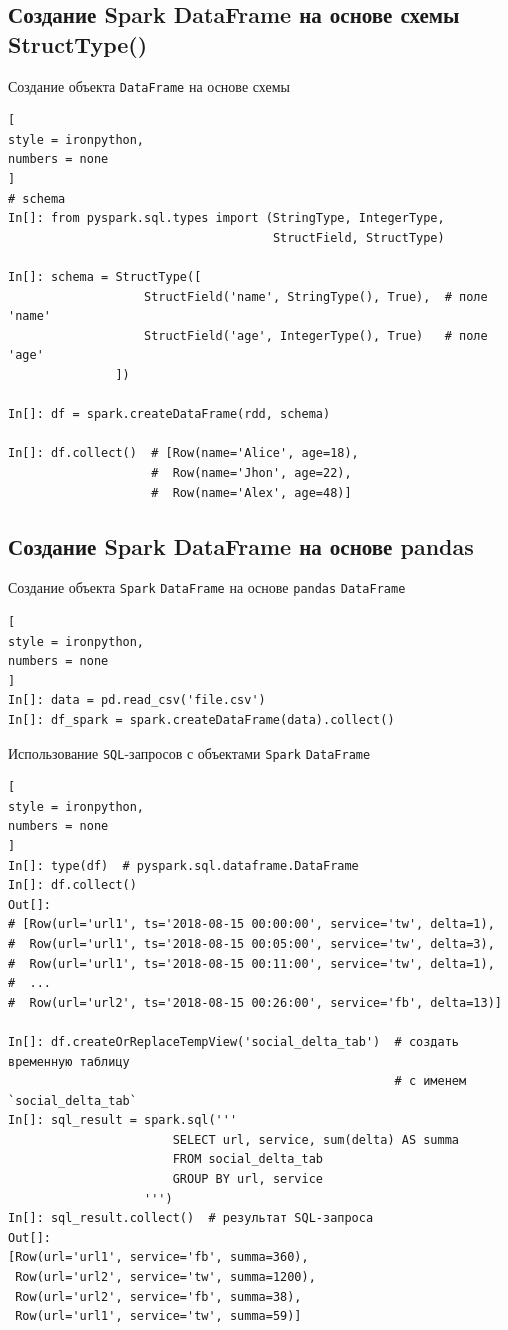 \documentclass[%
	11pt,
	a4paper,
	utf8,
		]{article}
\begin{document}
\subsection{Создание Spark DataFrame на основе схемы StructType()}

Создание объекта \texttt{DataFrame} на основе схемы

\begin{lstlisting}[
style = ironpython,
numbers = none
]
# schema
In[]: from pyspark.sql.types import (StringType, IntegerType,
                                     StructField, StructType)

In[]: schema = StructType([
                   StructField('name', StringType(), True),  # поле 'name'
                   StructField('age', IntegerType(), True)   # поле 'age'
               ])

In[]: df = spark.createDataFrame(rdd, schema)

In[]: df.collect()  # [Row(name='Alice', age=18),
                    #  Row(name='Jhon', age=22),
                    #  Row(name='Alex', age=48)]                               
\end{lstlisting}

\subsection{Создание Spark DataFrame на основе pandas}

Создание объекта \texttt{Spark} \texttt{DataFrame} на основе \texttt{pandas} \texttt{DataFrame}

\begin{lstlisting}[
style = ironpython,
numbers = none
]
In[]: data = pd.read_csv('file.csv')
In[]: df_spark = spark.createDataFrame(data).collect()
\end{lstlisting}


Использование \texttt{SQL}-запросов с объектами \texttt{Spark} \texttt{DataFrame}

\begin{lstlisting}[
style = ironpython,
numbers = none
]
In[]: type(df)  # pyspark.sql.dataframe.DataFrame
In[]: df.collect()
Out[]:
# [Row(url='url1', ts='2018-08-15 00:00:00', service='tw', delta=1),
#  Row(url='url1', ts='2018-08-15 00:05:00', service='tw', delta=3),
#  Row(url='url1', ts='2018-08-15 00:11:00', service='tw', delta=1),
#  ...
#  Row(url='url2', ts='2018-08-15 00:26:00', service='fb', delta=13)]

In[]: df.createOrReplaceTempView('social_delta_tab')  # создать временную таблицу
                                                      # с именем `social_delta_tab`
In[]: sql_result = spark.sql('''
                       SELECT url, service, sum(delta) AS summa
                       FROM social_delta_tab
                       GROUP BY url, service
                   ''')
In[]: sql_result.collect()  # результат SQL-запроса
Out[]:
[Row(url='url1', service='fb', summa=360),
 Row(url='url2', service='tw', summa=1200),
 Row(url='url2', service='fb', summa=38),
 Row(url='url1', service='tw', summa=59)]
\end{lstlisting}
\end{document}
